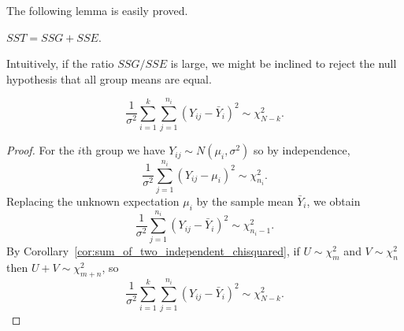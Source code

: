 The following lemma is easily proved.
\begin{lemma}
$SST = SSG + SSE$.
\end{lemma}

Intuitively, if the ratio $SSG/SSE$ is large, we might be inclined to reject the null hypothesis that all group means are equal.

\begin{lemma}
\[
\frac{1}{\sigma^2}\sum_{i=1}^k\sum_{j=1}^{n_i}(Y_{ij}-\bar{Y}_i)^2 \sim \chi^2_{N-k}.
\]
\end{lemma}

\begin{proof}
For the $i$th group we have $Y_{ij}\sim N(\mu_i,\sigma^2)$ so by independence,
\[
\frac{1}{\sigma^2}\sum_{j=1}^{n_i}(Y_{ij}-\mu_i)^2 \sim \chi^2_{n_i}.
\]
Replacing the unknown expectation $\mu_i$ by the sample mean $\bar{Y}_i$, we obtain
\[
\frac{1}{\sigma^2}\sum_{j=1}^{n_i}(Y_{ij}-\bar{Y}_i)^2 \sim \chi^2_{n_i-1}.
\]
By Corollary~\ref{cor:sum_of_two_independent_chisquared}, if $U\sim\chi^2_m$ and $V\sim\chi^2_n$ then $U+V\sim\chi^2_{m+n}$, so
\[
\frac{1}{\sigma^2}\sum_{i=1}^k\sum_{j=1}^{n_i}(Y_{ij}-\bar{Y}_i)^2 \sim \chi^2_{N-k}.
\]
\end{proof}

